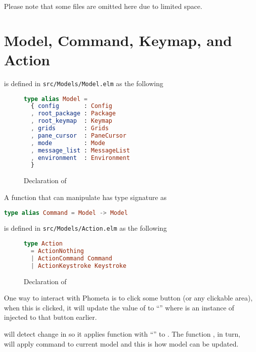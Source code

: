 \documentclass[master.tex]{subfiles}
\begin{document}
Please note that some files are omitted here due to limited space.

\newpage

\section{Model, Command, Keymap, and Action}
 is defined in \texttt{src/Models/Model.elm} as the following

\begin{figure}[H]
\begin{framed}
\begin{lstlisting}[language=elm]
type alias Model =
  { config       : Config
  , root_package : Package
  , root_keymap  : Keymap
  , grids        : Grids
  , pane_cursor  : PaneCursor
  , mode         : Mode
  , message_list : MessageList
  , environment  : Environment
  }
\end{lstlisting}
\end{framed}
\caption{Declaration of }
\label{fig:implementation-model}
\end{figure}

A function that can manipulate  has type signature as
\begin{lstlisting}[language=elm]
type alias Command = Model -> Model
\end{lstlisting}

 is defined in \texttt{src/Models/Action.elm}
as the following

\begin{figure}[H]
\begin{framed}
\begin{lstlisting}[language=elm]
type Action
  = ActionNothing
  | ActionCommand Command
  | ActionKeystroke Keystroke
\end{lstlisting}
\end{framed}
\caption{Declaration of }
\label{fig:implementation-action}
\end{figure}

One way to interact with Phometa is to click some button (or any clickable
area), when this is clicked, it will update the value of 
to ``'' where  is an instance of
 injected to that button earlier.

 will detect change in  so it applies
function  with ``'' to
. The function , in turn, will apply command
 to current model and this is how model can be updated.
\end{document}

